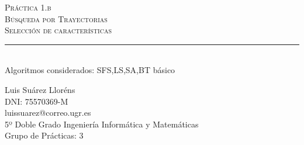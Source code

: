 \begin{titlepage}

\newcommand{\HRule}{\rule{\linewidth}{0.5mm}} %

\center %
 

\textsc{\LARGE Práctica 1.b}\\[1.0cm] %
\textsc{\Large Búsqueda por Trayectorias}\\[0.5cm] %
\textsc{\large Selección de características}\\[0.5cm] %


\HRule \\[0.4cm]
{Algoritmos considerados: SFS,LS,SA,BT básico}\\[0.4cm] %

 

\begin{minipage}{1\textwidth}
\begin{flushleft} \large
Luis Suárez Lloréns\\
DNI: 75570369-M\\
luissuarez@correo.ugr.es\\
5º Doble Grado Ingeniería Informática y Matemáticas\\
Grupo de Prácticas: 3
\end{flushleft}
\end{minipage}




\end{titlepage}
